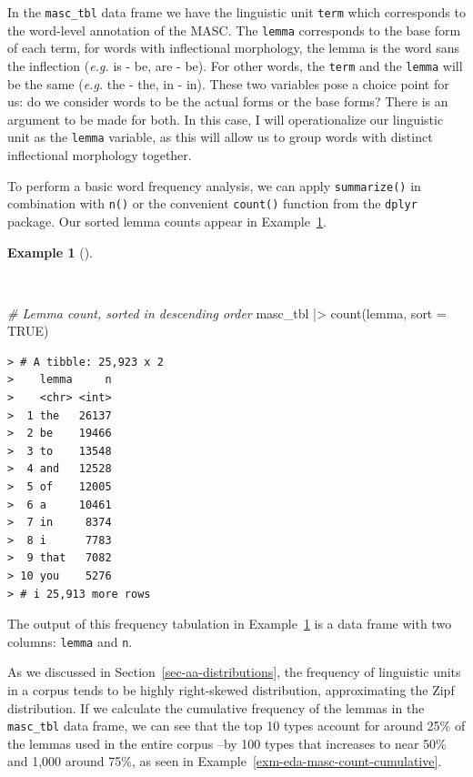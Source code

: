 \documentclass[
  letterpaper,
]{latex/krantz}
\newenvironment{Shaded}{\begin{snugshade}}{\end{snugshade}}
\newcommand{\AttributeTok}[1]{\textcolor[rgb]{0.00,0.00,0.00}{#1}}
\newcommand{\CommentTok}[1]{\textcolor[rgb]{0.00,0.00,0.00}{\textit{#1}}}
\newcommand{\ConstantTok}[1]{\textcolor[rgb]{0.00,0.00,0.00}{#1}}
\newcommand{\FunctionTok}[1]{\textcolor[rgb]{0.00,0.00,0.00}{#1}}
\newcommand{\NormalTok}[1]{\textcolor[rgb]{0.00,0.00,0.00}{#1}}
\newcommand{\SpecialCharTok}[1]{\textcolor[rgb]{0.00,0.00,0.00}{#1}}
\theoremstyle{definition}
\newtheorem{example}{Example}[chapter]
\theoremstyle{remark}
\begin{document}
In the \texttt{masc\_tbl} data frame we have the linguistic unit
\texttt{term} which corresponds to the word-level annotation of the
MASC. The \texttt{lemma} corresponds to the base form of each term, for
words with inflectional morphology, the lemma is the word sans the
inflection (\emph{e.g.} is - be, are - be). For other words, the
\texttt{term} and the \texttt{lemma} will be the same (\emph{e.g.} the -
the, in - in). These two variables pose a choice point for us: do we
consider words to be the actual forms or the base forms? There is an
argument to be made for both. In this case, I will operationalize our
linguistic unit as the \texttt{lemma} variable, as this will allow us to
group words with distinct inflectional morphology together.

To perform a basic word frequency analysis, we can apply
\texttt{summarize()} in combination with \texttt{n()} or the convenient
\texttt{count()} function from the \texttt{dplyr} package. Our sorted
lemma counts appear in Example~\ref{exm-eda-masc-count}.

\begin{example}[]\protect\hypertarget{exm-eda-masc-count}{}\label{exm-eda-masc-count}

~

\begin{Shaded}
\begin{Highlighting}[]
\CommentTok{\# Lemma count, sorted in descending order}
\NormalTok{masc\_tbl }\SpecialCharTok{|\textgreater{}}
  \FunctionTok{count}\NormalTok{(lemma, }\AttributeTok{sort =} \ConstantTok{TRUE}\NormalTok{)}
\end{Highlighting}
\end{Shaded}

\begin{verbatim}
> # A tibble: 25,923 x 2
>    lemma     n
>    <chr> <int>
>  1 the   26137
>  2 be    19466
>  3 to    13548
>  4 and   12528
>  5 of    12005
>  6 a     10461
>  7 in     8374
>  8 i      7783
>  9 that   7082
> 10 you    5276
> # i 25,913 more rows
\end{verbatim}

\end{example}

The output of this frequency tabulation in
Example~\ref{exm-eda-masc-count} is a data frame with two columns:
\texttt{lemma} and \texttt{n}.

As we discussed in Section~\ref{sec-aa-distributions}, the frequency of
linguistic units in a corpus tends to be highly right-skewed
distribution, approximating the Zipf distribution. If we calculate the
cumulative frequency of the lemmas in the \texttt{masc\_tbl} data frame,
we can see that the top 10 types account for around 25\% of the lemmas
used in the entire corpus --by 100 types that increases to near 50\% and
1,000 around 75\%, as seen in
Example~\ref{exm-eda-masc-count-cumulative}.
\end{document}
